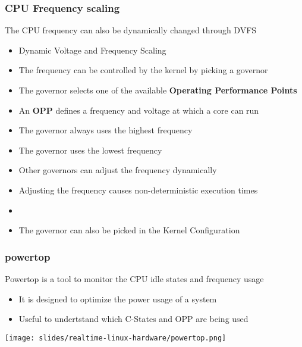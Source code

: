 \begin{frame}
        \frametitle{CPU Frequency scaling}
        The CPU frequency can also be dynamically changed through DVFS
        \begin{itemize}
                \item Dynamic Voltage and Frequency Scaling
                \item The frequency can be controlled by the kernel by picking a governor
                \item The governor selects one of the available \textbf{Operating Performance Points}
                \item An \textbf{OPP} defines a frequency and voltage at which a core can run
                \item The  governor always uses the highest frequency
                \item The  governor uses the lowest frequency
                \item Other governors can adjust the frequency dynamically
                \item Adjusting the frequency causes non-deterministic execution times
                \item {}
                \item The governor can also be picked in the Kernel Configuration
        \end{itemize}
\end{frame}

\begin{frame}
        \frametitle{powertop}
        Powertop is a tool to monitor the CPU idle states and frequency usage
        \begin{itemize}
                \item It is designed to optimize the power usage of a system
                \item Useful to undertstand which C-States and OPP are being used
        \end{itemize}
        \texttt{[image: slides/realtime-linux-hardware/powertop.png]}
\end{frame}



